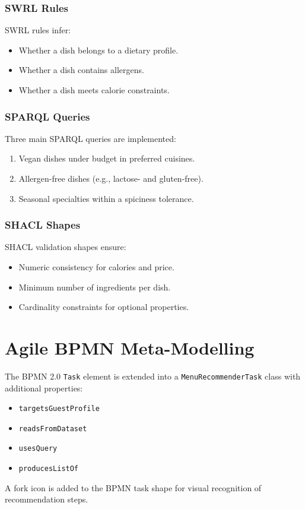 \documentclass[a4paper,12pt]{article}
\begin{document}
\subsubsection{SWRL Rules}
SWRL rules infer:
\begin{itemize}
    \item Whether a dish belongs to a dietary profile.
    \item Whether a dish contains allergens.
    \item Whether a dish meets calorie constraints.
\end{itemize}

\subsubsection{SPARQL Queries}
Three main SPARQL queries are implemented:
\begin{enumerate}
    \item Vegan dishes under budget in preferred cuisines.
    \item Allergen-free dishes (e.g., lactose- and gluten-free).
    \item Seasonal specialties within a spiciness tolerance.
\end{enumerate}

\subsubsection{SHACL Shapes}
SHACL validation shapes ensure:
\begin{itemize}
    \item Numeric consistency for calories and price.
    \item Minimum number of ingredients per dish.
    \item Cardinality constraints for optional properties.
\end{itemize}

\section{Agile BPMN Meta-Modelling}
The BPMN 2.0 \texttt{Task} element is extended into a \texttt{MenuRecommenderTask} class with additional properties:
\begin{itemize}
    \item \texttt{targetsGuestProfile}
    \item \texttt{readsFromDataset}
    \item \texttt{usesQuery}
    \item \texttt{producesListOf}
\end{itemize}
A fork icon is added to the BPMN task shape for visual recognition of recommendation steps.
\end{document}
